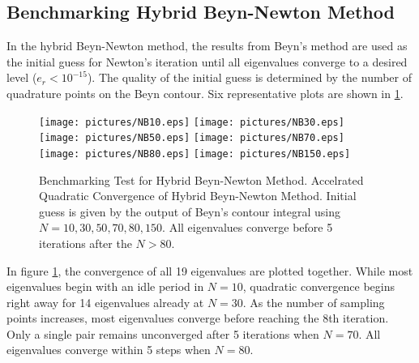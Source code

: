 \documentclass[final,leqno,onefignum,onetabnum]{siamltex1213}
\begin{document}
\subsection{Benchmarking Hybrid Beyn-Newton Method}
In the hybrid Beyn-Newton method, the results from Beyn's method are used as the initial guess for Newton's iteration until all eigenvalues converge to a desired level ($e_r<10^{-15}$). The quality of the initial guess is determined by the number of quadrature points on the Beyn contour. Six representative plots are shown in \ref{fig:BeynNewton}. 
\begin{figure}\label{fig:BeynNewton}
\begin{center}
\texttt{[image: pictures/NB10.eps]}
\texttt{[image: pictures/NB30.eps]}
\texttt{[image: pictures/NB50.eps]}
\texttt{[image: pictures/NB70.eps]}
\texttt{[image: pictures/NB80.eps]}
\texttt{[image: pictures/NB150.eps]}
\end{center}
\caption{Benchmarking Test for Hybrid Beyn-Newton Method. \textnormal{Accelrated Quadratic Convergence of Hybrid Beyn-Newton Method. Initial guess is given by the output of Beyn's contour integral using $N=10,30,50,70,80,150$. All eigenvalues converge before 5 iterations after the $N>80$.}}
\end{figure}
In figure \ref{fig:BeynNewton}, the convergence of all 19 eigenvalues are plotted together. While most eigenvalues begin with an idle period in $N=10$, quadratic convergence begins right away for 14 eigenvalues already at $N=30$.
As the number of sampling points increases, most eigenvalues converge before reaching the 8th iteration. Only a single pair remains unconverged after 5 iterations when $N=70$. All eigenvalues converge within 5 steps when $N=80$. 

\end{document}
